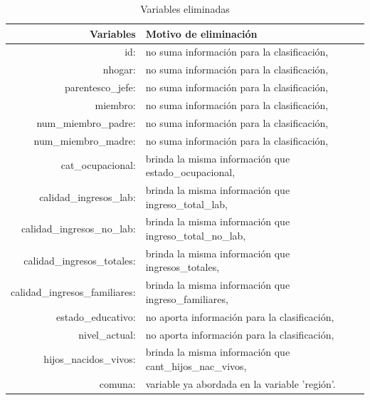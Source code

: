 \documentclass[a4paper]{article}
\begin{document}
        \begin{table}[H]
            \centering
            \vspace{-6pt}
            \begin{tabular}{rl}
                \toprule
                \textbf{Variables}              & \textbf{Motivo de eliminación} \\ \hline
                id:                             & no suma información para la clasificación, \\
                nhogar:                         & no suma información para la clasificación, \\
                parentesco\_jefe:               & no suma información para la clasificación, \\
                miembro:                        & no suma información para la clasificación, \\
                num\_miembro\_padre:            & no suma información para la clasificación, \\
                num\_miembro\_madre:            & no suma información para la clasificación, \\
                cat\_ocupacional:               & brinda la misma información que estado\_ocupacional, \\
                calidad\_ingresos\_lab:         & brinda la misma información que ingreso\_total\_lab, \\
                calidad\_ingresos\_no\_lab:     & brinda la misma información que ingreso\_total\_no\_lab, \\
                calidad\_ingresos\_totales:     & brinda la misma información que ingresos\_totales, \\
                calidad\_ingresos\_familiares:  & brinda la misma información que ingreso\_familiares, \\
                estado\_educativo:              & no aporta información para la clasificación, \\
                nivel\_actual:                  & no aporta información para la clasificación, \\
                hijos\_nacidos\_vivos:          & brinda la misma información que cant\_hijos\_nac\_vivos, \\
                comuna:                         & variable ya abordada en la variable 'región'. \\
                \bottomrule
            \end{tabular}
        \caption{Variables eliminadas}
        \label{Deleted variables}
    \end{table}
\end{document}
